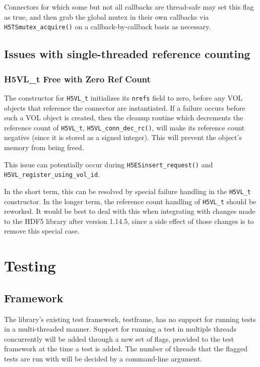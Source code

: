 \documentclass{article}
\begin{document}
Connectors for which some but not all callbacks are thread-safe may set this flag as true, and then grab the global mutex in their own callbacks via \texttt{H5TSmutex\_acquire()} on a callback-by-callback basis as necessary.


\subsection{Issues with single-threaded reference counting}
\label{sec:single-thread-issues}
\subsubsection{H5VL\_t Free with Zero Ref Count}

The constructor for \texttt{H5VL\_t} initializes its \texttt{nrefs} field to zero, before any VOL objects that reference the connector are instantiated. If a failure occurs before such a VOL object is created, then the cleanup routine which decrements the reference count of \texttt{H5VL\_t}, \texttt{H5VL\_conn\_dec\_rc()}, will make its reference count negative (since it is stored as a signed integer). This will prevent the object's memory from being freed.

This issue can potentially occur during \texttt{H5ESinsert\_request()} and \texttt{H5VL\_register\_using\_vol\_id}.

In the short term, this can be resolved by special failure handling in the \texttt{H5VL\_t} constructor. In the longer term, the reference count handling of \texttt{H5VL\_t} should be reworked. It would be best to deal with this when integrating with changes made to the HDF5 library after version 1.14.5, since a side effect of those changes is to remove this special case. 

\section{Testing}
\label{sec:testing}

\subsection{Framework}

The library's existing test framework, testframe, has no support for running tests in a multi-threaded manner. Support for running a test in multiple threads concurrently will be added through a new set of flags, provided to the test framework at the time a test is added. The number of threads that the flagged tests are run with will be decided by a command-line argument. 
\end{document}
